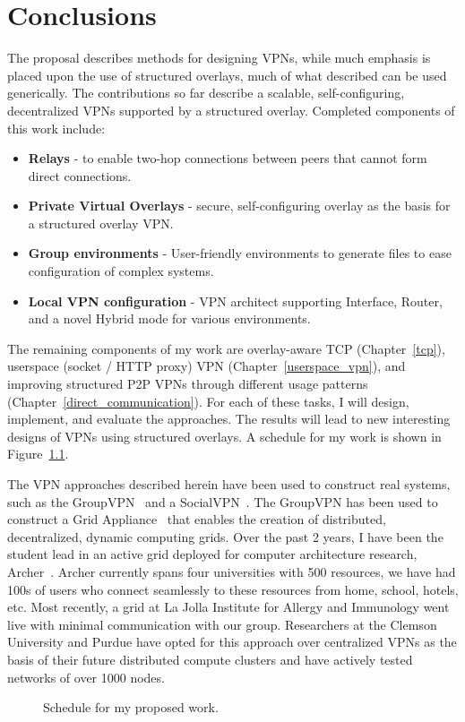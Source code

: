 \chapter{Conclusions}
\label{conclusion}
The proposal describes methods for designing VPNs, while much emphasis is
placed upon the use of structured overlays, much of what described can be used
generically.  The contributions so far describe a scalable, self-configuring,
decentralized VPNs supported by a structured overlay.  Completed components of
this work include:
\begin{itemize}
\item \textbf{Relays} - to enable two-hop connections between peers that cannot
form direct connections.
\item \textbf{Private Virtual Overlays} - secure, self-configuring overlay as
the basis for a structured overlay VPN.
\item \textbf{Group environments} - User-friendly environments to generate
files to ease configuration of complex systems.
\item \textbf{Local VPN configuration} - VPN architect supporting Interface,
Router, and a novel Hybrid mode for various environments.
\end{itemize}

The remaining components of my work are overlay-aware TCP (Chapter~\ref{tcp}),
userspace (socket / HTTP proxy) VPN (Chapter~\ref{userspace_vpn}), and
improving structured P2P VPNs through different usage patterns
(Chapter~\ref{direct_communication}).  For each of these tasks, I will design,
implement, and evaluate the approaches.  The results will lead to new
interesting designs of VPNs using structured overlays.  A schedule for my work
is shown in Figure~\ref{fig:gantt}.

The VPN approaches described herein have been used to construct real systems,
such as the GroupVPN~\cite{gridappliance} and a SocialVPN~\cite{cops08}.  The
GroupVPN has been used to construct a Grid Appliance~\cite{grid_appliance} that
enables the creation of distributed, decentralized, dynamic computing grids.
Over the past 2 years, I have been the student lead in an active grid deployed
for computer architecture research, Archer~\cite{archer}.  Archer currently
spans four universities with 500 resources, we have had 100s of users who
connect seamlessly to these resources from home, school, hotels, etc.  Most
recently, a grid at La Jolla Institute for Allergy and Immunology went live
with minimal communication with our group.  Researchers at the Clemson
University and Purdue have opted for this approach over centralized VPNs as the
basis of their future distributed compute clusters and have actively tested
networks of over 1000 nodes.

\begin{figure}[ht]
\centering
{}
\caption{Schedule for my proposed work.}
\label{fig:gantt}
\end{figure}

